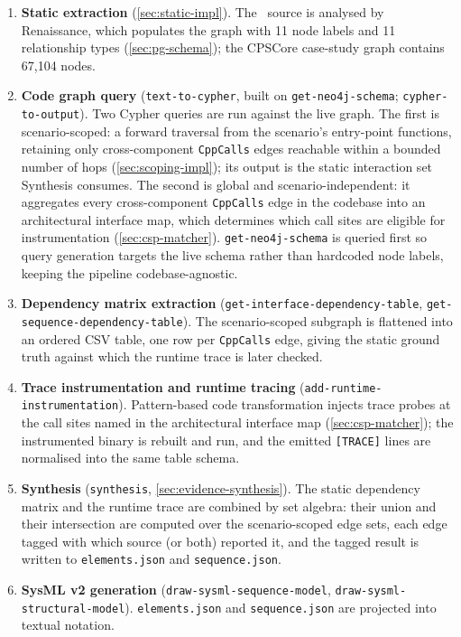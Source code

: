 \begin{enumerate}
  \item \textbf{Static extraction} (\cref{sec:static-impl}). The \Cpp\
    source is analysed by Renaissance, which populates the \neo graph
    with 11 node labels and 11 relationship types (\cref{sec:pg-schema});
    the CPSCore case-study graph contains 67,104 nodes.

  \item \textbf{Code graph query} (\texttt{text-to-cypher}, built on
    \texttt{get-neo4j-schema}; \texttt{cypher-to-output}). Two Cypher
    queries are run against the live graph. The first is
    scenario-scoped: a forward traversal from the scenario's
    entry-point functions, retaining only cross-component
    \texttt{CppCalls} edges reachable within a bounded number of hops
    (\cref{sec:scoping-impl}); its output is the static interaction set
    Synthesis consumes. The second is global and scenario-independent:
    it aggregates every cross-component \texttt{CppCalls} edge in the
    codebase into an architectural interface map, which determines
    which call sites are eligible for instrumentation
    (\cref{sec:csp-matcher}). \texttt{get-neo4j-schema} is queried first
    so query generation targets the live schema rather than hardcoded
    node labels, keeping the pipeline codebase-agnostic.

  \item \textbf{Dependency matrix extraction}
    (\texttt{get-interface-dependency-table},
    \texttt{get-sequence-dependency-table}). The scenario-scoped subgraph
    is flattened into an ordered CSV table, one row per \texttt{CppCalls}
    edge, giving the static ground truth against which the runtime trace
    is later checked.

  \item \textbf{Trace instrumentation and runtime tracing}
    (\texttt{add-runtime-instrumentation}). Pattern-based code
    transformation injects trace probes at the call sites named in the
    architectural interface map (\cref{sec:csp-matcher}); the
    instrumented binary is rebuilt and run, and the emitted
    \texttt{[TRACE]} lines are normalised into the same table schema.

  \item \textbf{Synthesis} (\texttt{synthesis}, \cref{sec:evidence-synthesis}).
    The static dependency matrix and the runtime trace are combined by
    set algebra: their union and their intersection are computed over
    the scenario-scoped edge sets, each edge tagged with which source
    (or both) reported it, and the tagged result is written to
    \texttt{elements.json} and \texttt{sequence.json}.

  \item \textbf{SysML v2 generation} (\texttt{draw-sysml-sequence-model},
    \texttt{draw-sysml-structural-model}). \texttt{elements.json} and
    \texttt{sequence.json} are projected into \sysml textual notation.
\end{enumerate}

